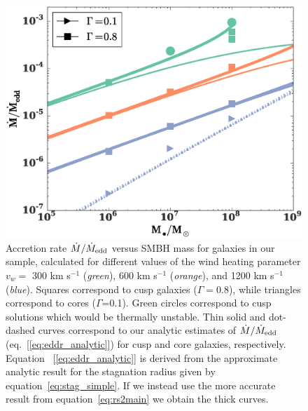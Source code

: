 \documentclass[usenatbib,fleqn]{mn2e}
\newcommand{\vwO}{v_{w}}
\begin{document}
\begin{figure}
  \includegraphics[width=\columnwidth]{mdot_mass.eps}
  \caption{\label{fig:mdot_mass} Accretion rate $\dot{M}/\dot{M}_{\rm
      edd}$ versus SMBH mass for galaxies in our sample, calculated
    for different values of the wind heating parameter $\vwO =$ 300 km
    s$^{-1}$ ({\it green}), 600 km s$^{-1}$ ({\it orange}), and 1200
    km s$^{-1}$ ({\it blue}).  Squares correspond to cusp galaxies
    ($\Gamma=0.8$), while triangles correspond to cores
    ($\Gamma$=0.1). Green circles correspond to cusp solutions which
    would be thermally unstable.  Thin solid and dot-dashed curves
    correspond to our analytic estimates of $\dot{M}/\dot{M}_{\rm
      edd}$ (eq.~[\ref{eq:eddr_analytic}]) for cusp and core galaxies,
    respectively. Equation ~[\ref{eq:eddr_analytic}] is derived from
    the approximate analytic result for the stagnation radius given by
    equation~\eqref{eq:stag_simple}. If we instead use the more
    accurate result from equation~\eqref{eq:rs2main} we obtain the
    thick curves.}
\end{figure}
\end{document}
